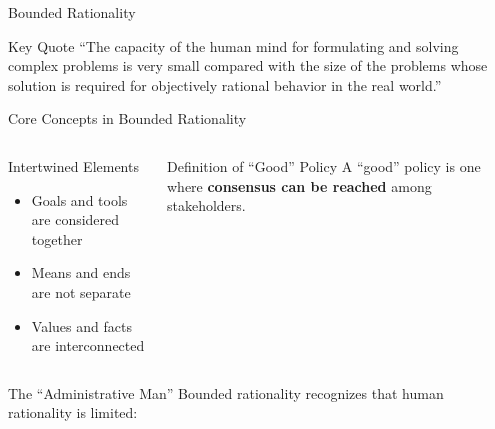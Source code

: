 \documentclass[10pt]{beamer}
\begin{document}
\begin{frame}{Bounded Rationality}
\begin{center}
\end{center}

\begin{block}{Key Quote}
``The capacity of the human mind for formulating and solving complex problems is very small compared with the size of the problems whose solution is required for objectively rational behavior in the real world.''
\end{block}

\begin{frame}{Core Concepts in Bounded Rationality}
\begin{columns}
\begin{column}{0.5\textwidth}
\begin{block}{Intertwined Elements}
\begin{itemize}
\item Goals and tools are considered together
\item Means and ends are not separate
\item Values and facts are interconnected
\end{itemize}
\end{block}
\end{column}
\begin{column}{0.5\textwidth}
\begin{block}{Definition of ``Good'' Policy}
A ``good'' policy is one where \textcolor{titanorange}{\textbf{consensus can be reached}} among stakeholders.
\end{block}
\end{column}
\end{columns}
\end{frame}

\begin{frame}{The ``Administrative Man''}
Bounded rationality recognizes that human rationality is limited:

\vspace{0.5cm}
\begin{center}
\end{center}
\end{frame}
\end{frame}
\end{document}
